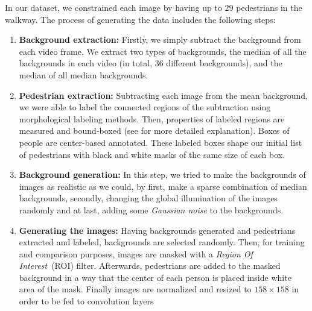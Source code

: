 In our dataset, we constrained each image by having up to 29 pedestrians in the walkway. The process of generating the data includes the following steps:
\begin{enumerate}

\item \textbf{Background extraction:} Firstly, we simply subtract the background from each video frame. We extract two types of backgrounds, the median of all the backgrounds in each video (in total, 36 different backgrounds), and the median of all median backgrounds.

\item \textbf{Pedestrian extraction:} Subtracting each image from the mean background, we were able to label the connected regions of the subtraction using morphological labeling methods. Then, properties of labeled regions are measured and bound-boxed (see \cite{van2014scikit} for more detailed explanation). Boxes of people are center-based annotated. These labeled boxes shape our initial list of pedestrians with black and white masks of the same size of each box.

\item \textbf{Background generation:} In this step, we tried to make the backgrounds of images as realistic as we could, by first, make a sparse combination of median backgrounds, secondly, changing the global illumination of the images randomly and at last, adding some \textit{Gaussian noise} to the backgrounds. 

\item \textbf{Generating the images:} Having backgrounds generated and pedestrians extracted and labeled, backgrounds are selected randomly. Then, for training and comparison purposes, images are masked with a \textit{Region Of Interest}~(ROI) filter. Afterwards, pedestrians are added to the masked background in a way that the center of each person is placed inside white area of the mask. Finally images are normalized and resized to $158\times158$ in order to be fed to convolution layers

\end{enumerate}

